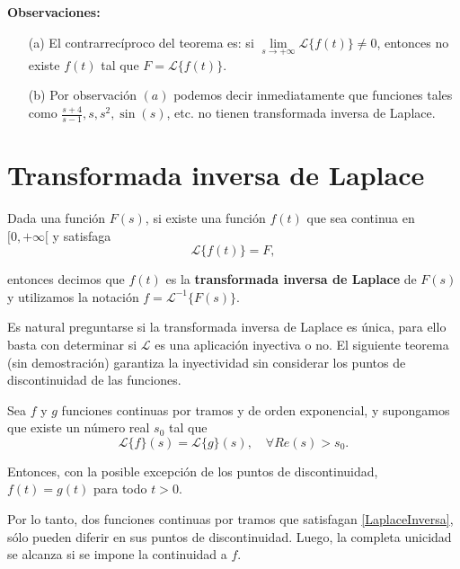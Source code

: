 \textbf{Observaciones:}

\begin{itemize}
\item[(a)] El contrarrecíproco del teorema es: si $\lim\limits_{s \to + \infty} \mathcal{L}\{f(t)\} \neq 0$, entonces no existe $f(t)$ tal que $F = \mathcal{L}\{f(t)\}$.

\item[(b)] Por observación $(a)$ podemos decir inmediatamente que funciones tales como $\frac{s+4}{s-1}, s, s^2, \sin(s)$, etc. no tienen transformada inversa de Laplace.
\end{itemize} 

\section{Transformada inversa de Laplace}

\begin{defi}
Dada una función $F(s)$, si existe una función $f(t)$ que sea continua en $[0, + \infty[$ y satisfaga
\begin{equation}
\mathcal{L}\{f(t)\} = F, \label{LaplaceInversa}
\end{equation}

entonces decimos que $f(t)$ es la \textbf{transformada inversa de Laplace} de $F(s)$ y utilizamos la notación $f = \mathcal{L}^{-1} \{F(s)\}$.
\end{defi}

Es natural preguntarse si la transformada inversa de Laplace es única, para ello basta con determinar si $\mathcal{L}$ es una aplicación inyectiva o no. El siguiente teorema (sin demostración) garantiza la inyectividad sin considerar los puntos de discontinuidad de las funciones.

\begin{teorema}[de Lerch]
 Sea $f$ y $g$ funciones continuas por tramos y de orden exponencial, y supongamos que existe un número real $s_0$ tal que
\begin{equation*}
\mathcal{L}\{f\}(s) = \mathcal{L}\{g\}(s), \quad \forall Re(s) >s_0.
\end{equation*}

Entonces, con la posible excepción de los puntos de discontinuidad, $f(t) = g(t)$ para todo $t >0$.
\end{teorema}

Por lo tanto, dos funciones continuas por tramos que satisfagan \eqref{LaplaceInversa}, sólo pueden diferir en sus puntos de discontinuidad. Luego, la completa unicidad se alcanza si se impone la continuidad a $f$.

